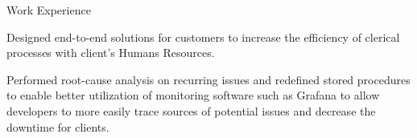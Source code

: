 \documentclass{resume} %
\begin{document}
\begin{workSection}{Work Experience}
     \experienceItem[
        company=Ultimate Kronos Group (UKG),
        location=Atlanta{,} GA,
        position=Full-stack Software Engineer Intern,
        duration=January 2022\textendash{August 2022},
     ]
    \begin{bullets}
        \item Designed end-to-end solutions for customers to increase the efficiency of clerical processes with client's Humans Resources.
        \item Performed root-cause analysis on recurring issues and redefined stored procedures to enable better utilization of monitoring software such as Grafana to allow developers to more easily trace sources of potential issues and decrease the downtime for clients.
    \end{bullets}
     
\end{workSection}

\end{document}
